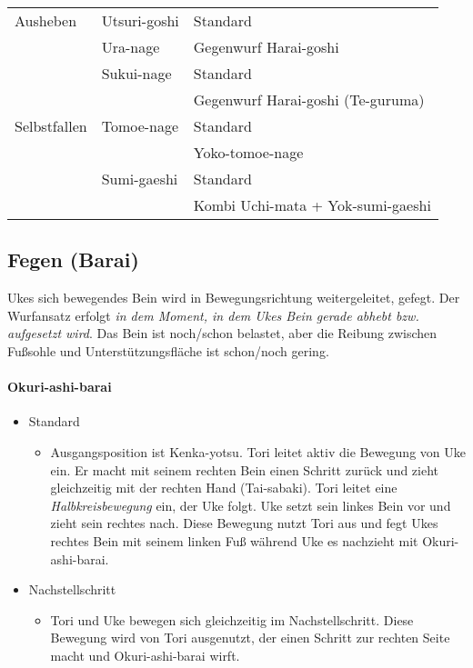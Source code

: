 \documentclass[justified, a4paper, notitlepage, captions=tableheading, nobib]{tufte-handout}
\begin{document}
\begin{center}
\begin{tabular}{lll}
Ausheben & Utsuri-goshi & Standard\\
 & Ura-nage & Gegenwurf Harai-goshi\\
 & Sukui-nage & Standard\\
 &  & Gegenwurf Harai-goshi (Te-guruma)\\
Selbstfallen & Tomoe-nage & Standard\\
 &  & Yoko-tomoe-nage\\
 & Sumi-gaeshi & Standard\\
 &  & Kombi Uchi-mata + Yok-sumi-gaeshi\footnotemark\\
\end{tabular}
\end{center}

\subsection{Fegen (Barai) }
\label{sec:org66294c9}
Ukes sich bewegendes Bein wird in Bewegungsrichtung weitergeleitet, gefegt. 
Der Wurfansatz erfolgt \emph{in dem Moment, in dem Ukes Bein gerade abhebt bzw. aufgesetzt wird}. 
Das Bein ist noch/schon belastet, aber die Reibung zwischen Fußsohle und Unterstützungsfläche ist schon/noch gering.

\paragraph{Okuri-ashi-barai }
\label{sec:org65463c9}
\begin{itemize}
\item Standard
\begin{itemize}
\item Ausgangsposition ist Kenka-yotsu. Tori leitet aktiv die Bewegung von Uke ein. Er macht mit seinem rechten Bein einen Schritt zurück und zieht gleichzeitig mit der rechten Hand (Tai-sabaki). Tori leitet eine \emph{Halbkreisbewegung} ein, der Uke folgt. Uke setzt sein linkes Bein vor und zieht sein rechtes nach. Diese Bewegung nutzt Tori aus und fegt Ukes rechtes Bein mit seinem linken Fuß während Uke es nachzieht mit Okuri-ashi-barai.
\end{itemize}
\item Nachstellschritt
\begin{itemize}
\item Tori und Uke bewegen sich gleichzeitig im Nachstellschritt. Diese Bewegung wird von Tori ausgenutzt, der einen Schritt zur rechten Seite macht und Okuri-ashi-barai wirft.
\end{itemize}
\end{itemize}
\end{document}
